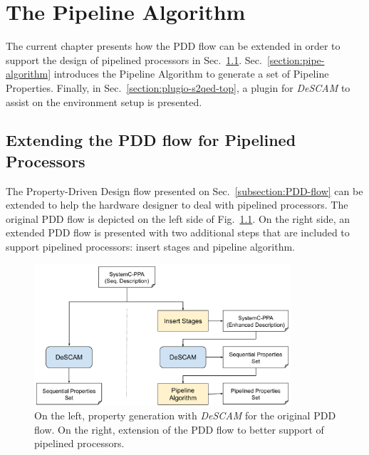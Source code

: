 \chapter{The Pipeline Algorithm}
\label{chapter:algorithm}

The current chapter presents how the PDD flow can be extended in order to support the design of pipelined processors in Sec.~\ref{section:extend-pdd}. Sec.~\ref{section:pipe-algorithm} introduces the Pipeline Algorithm to generate a set of Pipeline Properties. Finally, in Sec.~\ref{section:plugio-s2qed-top}, a plugin for \textit{DeSCAM} to assist on the \SSQED{} environment setup is presented. 

\section{Extending the PDD flow for Pipelined Processors}
\label{section:extend-pdd}

The Property-Driven Design flow presented on Sec.~\ref{subsection:PDD-flow} can be extended to help the hardware designer to deal with pipelined processors. The original PDD flow is depicted on the left side of Fig.~\ref{fig:new-pdd-flow}. On the right side, an extended PDD flow is presented with two additional steps that are included to support pipelined processors: insert stages and pipeline algorithm. 

\begin{figure}[htb!]
	\centering
	\includegraphics[width=0.85\textwidth]{images/new_pdd_flow.pdf}
	\caption{On the left, property generation with \textit{DeSCAM} for the original PDD flow. On the right, extension of the PDD flow to better support of pipelined processors.}
	\label{fig:new-pdd-flow}
\end{figure}

